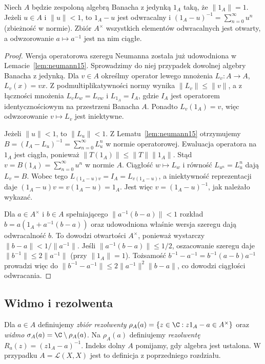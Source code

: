 \begin{lemat}
\label{lem:neumann31}
Niech $A$ będzie zespoloną algebrą Banacha z jedynką
$1_A$ taką, że $\|1_A\|=1$.
Jeżeli $u\in A$ i $\|u\|<1$, to $1_A-u$ jest odwracalny i
$(1_A-u)^{-1}=\sum_{n=0}^\infty u^n$ (zbieżność w normie).
Zbiór $A^\times$ wszystkich elementów odwracalnych jest otwarty,
a odwzorowanie $a\mapsto a^{-1}$ jest na nim ciągłe.
\end{lemat}
\begin{proof}
Wersja operatorowa szeregu Neumanna została już udowodniona
w Lemacie~\ref{lem:neumann15}. Sprowadzimy do niej przypadek
dowolnej algebry Banacha z jedynką. Dla $v\in A$ określmy
operator lewego mnożenia $L_v:A\to A$, $L_v(x)=vx$.
Z podmultiplikatywności normy wynika $\|L_v\|\le\|v\|$,
a z łączności mnożenia $L_vL_w=L_{vw}$ i $L_{1_A}=I_A$,
gdzie $I_A$ jest operatorem identycznościowym na przestrzeni
Banacha $A$. Ponadto $L_v(1_A)=v$, więc odwzorowanie
$v\mapsto L_v$ jest iniektywne.

Jeżeli $\|u\|<1$, to $\|L_u\|<1$. Z Lematu~\ref{lem:neumann15}
otrzymujemy $B=(I_A-L_u)^{-1}=\sum_{n=0}^\infty L_u^n$
w normie operatorowej. Ewaluacja operatora na $1_A$ jest
ciągła, ponieważ $\|T(1_A)\|\le\|T\|\|1_A\|$.
Stąd $v=B(1_A)=\sum_{n=0}^\infty u^n$ w normie $A$.
Ciągłość $w\mapsto L_w$ i równość $L_{u^n}=L_u^n$
dają $L_v=B$. Wobec tego
$L_{(1_A-u)v}=I_A=L_{v(1_A-u)}$, a iniektywność
reprezentacji daje $(1_A-u)v=v(1_A-u)=1_A$.
Jest więc $v=(1_A-u)^{-1}$, jak należało wykazać.

Dla $a\in A^\times$ i $b\in A$ spełniającego
$\|a^{-1}(b-a)\|<1$ rozkład $b=a(1_A+a^{-1}(b-a))$
oraz udowodniona właśnie wersja szeregu dają odwracalność
$b$. To dowodzi otwartości $A^\times$, ponieważ wystarczy
$\|b-a\|<1/\|a^{-1}\|$. Jeśli
$\|a^{-1}(b-a)\|\le1/2$, oszacowanie szeregu daje
$\|b^{-1}\|\le2\|a^{-1}\|$ (przy $\|1_A\|=1$).
Tożsamość $b^{-1}-a^{-1}=b^{-1}(a-b)a^{-1}$ prowadzi
więc do $\|b^{-1}-a^{-1}\|\le2\|a^{-1}\|^2\|b-a\|$,
co dowodzi ciągłości odwracania.
\end{proof}

\subsection{Widmo i rezolwenta}

\begin{definicja}
\label{def:spectrum31}
Dla $a\in A$ definiujemy \emph{zbiór rezolwenty}
$\rho_A(a)=\{z\in\C:z1_A-a\in A^\times\}$ oraz
\emph{widmo} $\sigma_A(a)=\C\setminus\rho_A(a)$.
Na $\rho_A(a)$ definiujemy \emph{rezolwentę}
$R_a(z)=(z1_A-a)^{-1}$.
Indeks dolny $A$ pomijamy, gdy algebra jest ustalona. W przypadku
$A=\mathcal L(X,X)$ jest to definicja z poprzedniego rozdziału.
\end{definicja}

